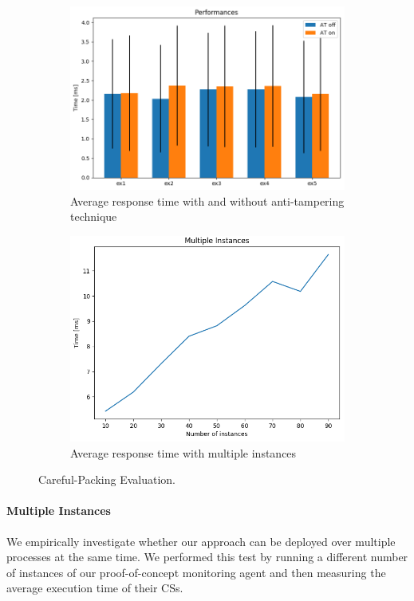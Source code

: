 \begin{figure}[t]
	\centering
	\begin{subfigure}[t]{0.45\textwidth}
		\includegraphics[width=\linewidth]{fig_c3/performanceEvaluation}
		\caption{Average response time with and without anti-tampering 
		technique}
		\label{fig:performanceEvaluation}
	\end{subfigure}
	\hfill
	\begin{subfigure}[t]{0.45\textwidth}
		\includegraphics[width=\linewidth]{fig_c3/multiple}
		\caption{Average response time with multiple instances}
		\label{fig:multiple}
	\end{subfigure}
	\caption{Careful-Packing Evaluation.}
	\label{fig:performance2}
\end{figure}

\paragraph{\textbf{Multiple Instances}}
We empirically investigate whether our approach can be deployed over multiple 
processes at the same time.
We performed this test by running a different number of instances of our 
proof-of-concept monitoring agent and then measuring the average execution time 
of their CSs.

